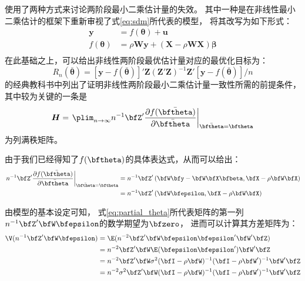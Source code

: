\documentclass[black,normal,authoryear]{elegantnote}
\newcommand{\bmw}{\bm{W}}
\newcommand{\bmx}{\bm{X}}
\newcommand{\bmz}{\bm{Z}}
\newcommand{\cqref}[1]{式\eqref{#1}}
\begin{document}
    \cite{kelejian1997}使用了两种方式来讨论两阶段最小二乘估计量的失效。
    其中一种是在非线性最小二乘估计的框架下重新审视了\cqref{eq:sdm}所代表的模型，
    将其改写为如下形式：
    \begin{equation}
        \begin{split}
            \bm{y}&=f(\bm{\theta})+\bm{u}\\
            f(\bm{\theta})&=\rho\bm{Wy}+(\bmx-\rho\bmw\bmx)\bm{\beta}\\
        \end{split}
    \end{equation}
    在此基础之上，可以给出非线性两阶段最优估计量对应的最优化目标为：
    \begin{equation}
        \label{eq:object}
        R_n(\bar{\bm{\theta}})=\left[\bm{y}-f(\bar{\bm{\theta}})\right]'\bmz(\bmz'\bmz)^{-1}\bmz'\left[\bm{y}-f(\bar{\bm{\theta}})\right]/n
    \end{equation}
    \cite{amemiya1985}的经典教科书中列出了证明非线性两阶段最小二乘估计量一致性所需的前提条件，
    其中较为关键的一条是
    \begin{equation}
        \label{eq:H}
        \bm{H}=\left.\plim_{n\to\infty}n^{-1}\bfZ'\frac{\partial f(\bar{\bftheta})}{\partial\bar{\bftheta}}\right|_{\bar{\bftheta}=\bftheta}
    \end{equation}
    为列满秩矩阵。

    由于我们已经得知了$f(\bftheta)$的具体表达式，从而可以给出：
    \begin{equation}
        \label{eq:partial_theta}
        \begin{split}
            \left.n^{-1}\bfZ'\frac{\partial f(\bar{\bftheta})}{\partial\bar{\bftheta}}\right|_{\bar{\bftheta}=\bftheta}
            &=n^{-1}\bfZ'\left(\bfW\bfy-\bfW\bfX\bfbeta,\bfX-\rho\bfW\bfX\right)\\
            &=n^{-1}\bfZ'\left(\bfW\bfepsilon,\bfX-\rho\bfW\bfX\right)
        \end{split}
    \end{equation}

    由模型的基本设定可知，
    \cqref{eq:partial_theta}所代表矩阵的第一列$n^{-1}\bfZ'\bfW\bfepsilon$的数学期望为$\bfzero$，
    进而可以计算其方差矩阵为：
    \begin{equation}
        \label{eq:variance_epsilon}
        \begin{split}
            \V(n^{-1}\bfZ'\bfW\bfepsilon)
            &=\E(n^{-2}\bfZ'\bfW\bfepsilon\bfepsilon'\bfW'\bfZ)\\
            &=n^{-2}\bfZ'\bfW\E(\bfepsilon\bfepsilon')\bfW'\bfZ\\
            &=n^{-2}\bfZ'\bfW\sigma^2(\bfI-\rho\bfW)^{-1}(\bfI-\rho\bfW')^{-1}\bfW'\bfZ\\
            &=n^{-2}\sigma^2\bfZ'\bfW(\bfI-\rho\bfW)^{-1}(\bfI-\rho\bfW')^{-1}\bfW'\bfZ\\
        \end{split}
    \end{equation}
    
\end{document}
